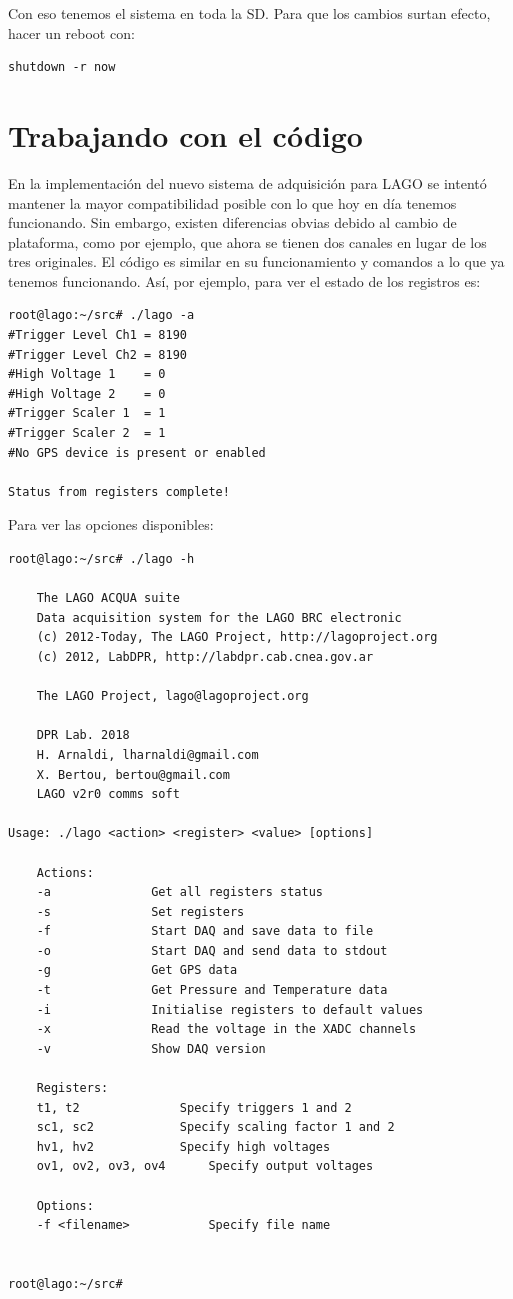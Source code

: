 \documentclass[a4paper,11pt]{article}
\begin{document}
\noindent Con eso tenemos el sistema en toda la SD. Para que los cambios surtan
efecto, hacer un reboot con: 
\begin{verbatim}
shutdown -r now
\end{verbatim}

\section{Trabajando con el código}

En la implementación del nuevo sistema de adquisición para LAGO se intentó
mantener la mayor compatibilidad posible con lo que hoy en día tenemos
funcionando. Sin embargo, existen diferencias obvias debido al cambio de
plataforma, como por ejemplo, que ahora se tienen dos canales en
lugar de los tres originales. El código es similar en su
funcionamiento y comandos a lo que ya tenemos funcionando. Así, por
ejemplo, para ver el estado de los registros es:

\begin{verbatim}
root@lago:~/src# ./lago -a
#Trigger Level Ch1 = 8190
#Trigger Level Ch2 = 8190
#High Voltage 1    = 0 
#High Voltage 2    = 0
#Trigger Scaler 1  = 1
#Trigger Scaler 2  = 1
#No GPS device is present or enabled

Status from registers complete!
\end{verbatim}

\noindent Para ver las opciones disponibles:
\begin{verbatim}
root@lago:~/src# ./lago -h

	The LAGO ACQUA suite
	Data acquisition system for the LAGO BRC electronic
	(c) 2012-Today, The LAGO Project, http://lagoproject.org
	(c) 2012, LabDPR, http://labdpr.cab.cnea.gov.ar

	The LAGO Project, lago@lagoproject.org

	DPR Lab. 2018
	H. Arnaldi, lharnaldi@gmail.com
	X. Bertou, bertou@gmail.com
	LAGO v2r0 comms soft

Usage: ./lago <action> <register> <value> [options]

	Actions:
	-a				Get all registers status
	-s				Set registers
	-f				Start DAQ and save data to file
	-o				Start DAQ and send data to stdout
	-g				Get GPS data
	-t				Get Pressure and Temperature data
	-i				Initialise registers to default values
	-x				Read the voltage in the XADC channels
	-v				Show DAQ version

	Registers:
	t1, t2				Specify triggers 1 and 2
	sc1, sc2			Specify scaling factor 1 and 2
	hv1, hv2			Specify high voltages
	ov1, ov2, ov3, ov4		Specify output voltages

	Options:
	-f <filename>			Specify file name


root@lago:~/src# 

\end{verbatim}
\end{document}
